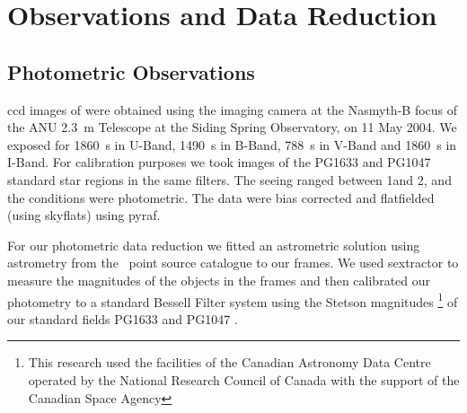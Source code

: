 \section{Observations and Data Reduction}
\label{sec:obs_red}
\subsection{Photometric Observations}
\Gls{ccd} images of  were obtained using the imaging camera at the Nasmyth-B focus of the ANU 2.3~m Telescope at
the Siding Spring Observatory, on 11 May 2004. We exposed for 1860~s in U-Band, 1490~s in B-Band, 788~s in V-Band and 1860~s in I-Band. For calibration purposes we took images of the PG1633 and PG1047 standard star regions in the same filters. The seeing ranged between 1\arcsec and 2\arcsec, and the conditions were photometric. 
The data were bias corrected and flatfielded (using skyflats) using \gls{pyraf}.

For our photometric data reduction we fitted an astrometric solution using astrometry from the \twomass\ point source catalogue \citep{2006AJ....131.1163S} to our frames. 
We used \gls{sextractor} to measure the magnitudes of the objects in the frames and then calibrated our photometry to a standard Bessell Filter system using the Stetson magnitudes \footnote{This research used the facilities of the Canadian Astronomy Data Centre operated by the National Research Council of Canada with the support of the Canadian Space Agency} of our standard fields PG1633 and PG1047 .  


